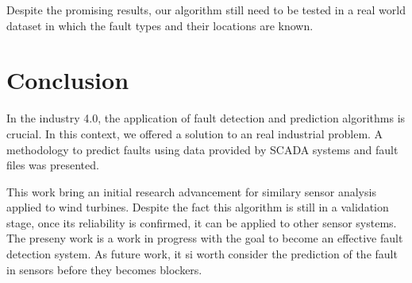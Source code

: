 \documentclass[conference]{IEEEtran}
\begin{document}
Despite the promising results, our algorithm still need to be tested in a real world dataset in which the fault types and their locations are known.

\section{Conclusion}\label{sec:conclusion}

In the industry 4.0, the application of fault detection and prediction algorithms is crucial. In this context, we offered a solution to an real industrial problem. A methodology to predict faults using data provided by SCADA systems and fault files was presented. 

This work bring an initial research advancement for similary sensor analysis applied to wind turbines. Despite the fact this algorithm is still in a validation stage, once its reliability is confirmed, it can be applied to other sensor systems. The preseny work is a work in progress with the goal to become an effective fault detection system.
As future work, it si worth consider the prediction of the fault in sensors before they becomes blockers.



\end{document}
